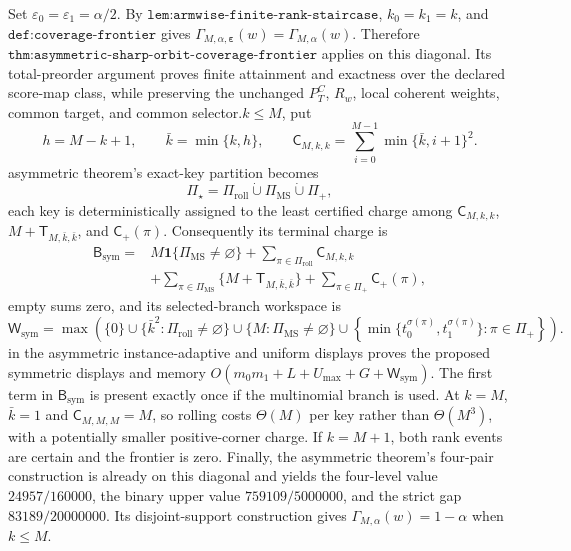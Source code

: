 Set \(\varepsilon_0=\varepsilon_1=\alpha/2\). By \(\texttt{lem:armwise-finite-rank-staircase}\), \(k_0=k_1=k\), and \(\texttt{def:coverage-frontier}\) gives \(\Gamma_{M,\alpha,\boldsymbol\varepsilon}(w)=\Gamma_{M,\alpha}(w)\). Therefore \(\texttt{thm:asymmetric-sharp-orbit-coverage-frontier}\) applies on this diagonal. Its total-preorder argument proves finite attainment and exactness over the declared score-map class, while preserving the unchanged \(P_T^C\), \(R_w\), local coherent weights, common target, and common selector.\n\nWhen \(k\le M\), put\n\[h=M-k+1,\qquad \bar k=\min\{k,h\},\qquad \mathsf C_{M,k,k}=\sum_{i=0}^{M-1}\min\{\bar k,i+1\}^2.\]\nThe asymmetric theorem's exact-key partition becomes\n\[\Pi_\star=\Pi_{\mathrm{roll}}\mathbin{\dot\cup}\Pi_{\mathrm{MS}}\mathbin{\dot\cup}\Pi_+,\]\nwhere each key is deterministically assigned to the least certified charge among \(\mathsf C_{M,k,k}\), \(M+\mathsf T_{M,\bar k,\bar k}\), and \(\mathsf C_+(\pi)\). Consequently its terminal charge is\n\[\begin{aligned}\mathsf B_{\mathrm{sym}}={}&M\mathbf 1\{\Pi_{\mathrm{MS}}\ne\varnothing\}+\sum_{\pi\in\Pi_{\mathrm{roll}}}\mathsf C_{M,k,k}\\&+\sum_{\pi\in\Pi_{\mathrm{MS}}}\{M+\mathsf T_{M,\bar k,\bar k}\}+\sum_{\pi\in\Pi_+}\mathsf C_+(\pi),\end{aligned}\]\nwith empty sums zero, and its selected-branch workspace is\n\[\mathsf W_{\mathrm{sym}}=\max\!\left(\{0\}\cup\{\bar k^2:\Pi_{\mathrm{roll}}\ne\varnothing\}\cup\{M:\Pi_{\mathrm{MS}}\ne\varnothing\}\cup\left\{\min\{t_0^{\sigma(\pi)},t_1^{\sigma(\pi)}\}:\pi\in\Pi_+\right\}\right).\]\nSubstitution in the asymmetric instance-adaptive and uniform displays proves the proposed symmetric displays and memory \(O(m_0m_1+L+U_{\max}+G+\mathsf W_{\mathrm{sym}})\). The first term in \(\mathsf B_{\mathrm{sym}}\) is present exactly once if the multinomial branch is used. At \(k=M\), \(\bar k=1\) and \(\mathsf C_{M,M,M}=M\), so rolling costs \(\Theta(M)\) per key rather than \(\Theta(M^3)\), with a potentially smaller positive-corner charge. If \(k=M+1\), both rank events are certain and the frontier is zero. Finally, the asymmetric theorem's four-pair construction is already on this diagonal and yields the four-level value \(24957/160000\), the binary upper value \(759109/5000000\), and the strict gap \(83189/20000000\). Its disjoint-support construction gives \(\Gamma_{M,\alpha}(w)=1-\alpha\) when \(k\le M\).